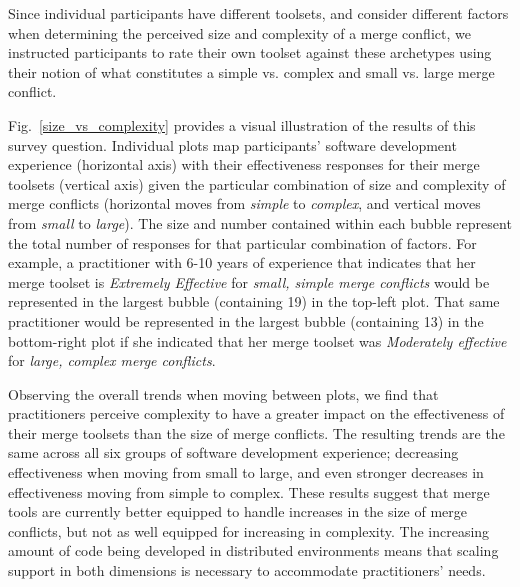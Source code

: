 Since individual participants have different toolsets, and consider different factors when determining the perceived size and complexity of a merge conflict, we instructed participants to rate their own toolset against these archetypes using their notion of what constitutes a simple vs. complex and small vs. large merge conflict.

Fig.~\ref{size_vs_complexity} provides a visual illustration of the results of this survey question.
Individual plots map participants' software development experience (horizontal axis) with their effectiveness responses for their merge toolsets (vertical axis) given the particular combination of size and complexity of merge conflicts (horizontal moves from \textit{simple} to \textit{complex}, and vertical moves from \textit{small} to \textit{large}).
The size and number contained within each bubble represent the total number of responses for that particular combination of factors.
For example, a practitioner with 6-10 years of experience that indicates that her merge toolset is \textit{Extremely Effective} for \textit{small, simple merge conflicts} would be represented in the largest bubble (containing 19) in the top-left plot.
That same practitioner would be represented in the largest bubble (containing 13) in the bottom-right plot if she indicated that her merge toolset was \textit{Moderately effective} for \textit{large, complex merge conflicts}.

Observing the overall trends when moving between plots, we find that practitioners perceive complexity to have a greater impact on the effectiveness of their merge toolsets than the size of merge conflicts.
The resulting trends are the same across all six groups of software development experience; decreasing effectiveness when moving from small to large, and even stronger decreases in effectiveness moving from simple to complex.
These results suggest that merge tools are currently better equipped to handle increases in the size of merge conflicts, but not as well equipped for increasing in complexity.
The increasing amount of code being developed in distributed environments means that scaling support in both dimensions is necessary to accommodate practitioners' needs.